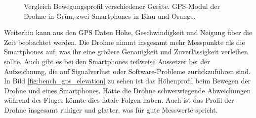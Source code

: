 \begin{figure}[h!]
    \centering
            
    \caption{Vergleich Bewegungsprofil verschiedener Geräte. GPS-Modul der Drohne in Grün, zwei Smartphones in Blau und Orange.}
    \label{fig:bench_gps}
\end{figure}

Weiterhin kann aus den GPS Daten Höhe, Geschwindigkeit und Neigung über die Zeit beobachtet werden. Die Drohne nimmt insgesamt mehr Messpunkte als die Smartphones auf, was ihr eine größere Genauigkeit und Zuverlässigkeit verleihen sollte. Auch gibt es bei den Smartphones teilweise Aussetzer bei der Aufzeichnung, die auf Signalverlust oder Software-Probleme zurückzuführen sind. In Bild \ref{fig:bench_gps_elevation} zu sehen ist das Höhenprofil beim Bewegen der Drohne und eines Smartphones. Hätte die Drohne schwerwiegende Abweichungen während des Fluges könnte dies fatale Folgen haben. Auch ist das Profil der Drohne insgesamt ruhiger und glatter, was für gute Messwerte spricht.  

